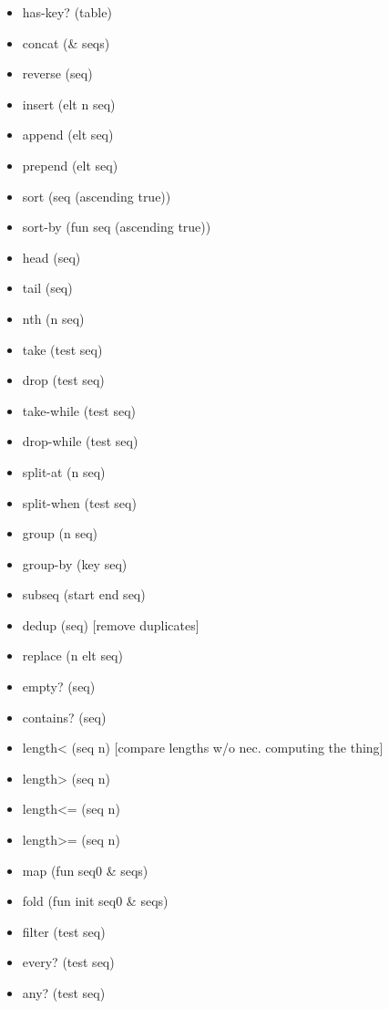 \documentclass[11pt]{article}
\begin{document}
\begin{itemize}
\item has-key? (table)

\item concat (\& seqs)
\item reverse (seq)

\item insert (elt n seq)
\item append (elt seq)
\item prepend (elt seq)
\item sort (seq (ascending true))
\item sort-by (fun seq (ascending true))

\item head (seq)
\item tail (seq)
\item nth (n seq)

\item take (test seq)
\item drop (test seq)
\item take-while (test seq)
\item drop-while (test seq)
\item split-at (n seq)
\item split-when (test seq)

\item group (n seq)
\item group-by (key seq)
\item subseq (start end seq)

\item dedup (seq) [remove duplicates]
\item replace (n elt seq)

\item empty? (seq)
\item contains? (seq)

\item length< (seq n) [compare lengths w/o nec. computing the thing]
\item length> (seq n)
\item length<= (seq n)
\item length>= (seq n)

\item map (fun seq0 \& seqs)
\item fold (fun init seq0 \& seqs)
\item filter (test seq)
\item every? (test seq)
\item any? (test seq)
\end{itemize}
\end{document}
